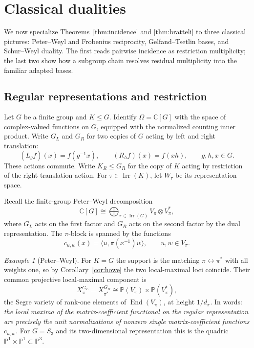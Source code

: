 \documentclass[10pt]{amsart}
\theoremstyle{remark}
\newtheorem{example}[theorem]{Example}
\DeclareMathOperator{\End}{End}
\newcommand{\PP}{\mathbb P}
\begin{document}
\section{Classical dualities}\label{sec:examples}

We now specialize Theorems~\ref{thm:incidence} and \ref{thm:bratteli} to three classical pictures:
Peter--Weyl and Frobenius reciprocity, Gelfand--Tsetlin bases, and Schur--Weyl duality. The first reads
pairwise incidence as restriction multiplicity; the last two show how a subgroup chain resolves residual
multiplicity into the familiar adapted bases.

\subsection{Regular representations and restriction}

Let $G$ be a finite group and $K\leq G$.
Identify $\Omega=\mathbb{C}[G]$ with the space of
complex-valued functions on $G$, equipped with the
normalized counting inner product.
Write $G_L$ and $G_R$ for two copies of $G$ acting by
left and right translation:
\[
 (L_gf)(x)=f(g^{-1}x),
 \qquad
 (R_hf)(x)=f(xh),
 \qquad g,h,x\in G.
\]
These actions commute.
Write $K_R\leq G_R$ for the copy of $K$ acting by
restriction of the right translation action.
For $\tau\in\operatorname{Irr}(K)$, let $W_\tau$
be its representation space.

Recall the finite-group Peter--Weyl decomposition \cite{GoodmanWallach}
\[
 \mathbb{C}[G]
 \cong
 \bigoplus_{\pi\in\operatorname{Irr}(G)}
 V_\pi\otimes V_\pi^*,
\]
where $G_L$ acts on the first factor and $G_R$
acts on the second factor by the dual representation.
The $\pi$-block is spanned by the functions
\[
 c_{u,w}(x)=\langle u,\pi(x^{-1})w\rangle,
 \qquad u,w\in V_\pi.
\]

\begin{example}[Peter--Weyl]\label{ex:PW}
For $K=G$ the support is the matching $\pi\leftrightarrow\pi^*$ with all weights one, so by
Corollary~\ref{cor:howe} the two local-maximal loci coincide. Their common projective
local-maximal component is
\[
 X_\pi^{G_L}=X_{\pi^*}^{G_R}
 \cong\PP(V_\pi)\times\PP(V_\pi^*),
\]
the Segre variety of rank-one elements of $\End(V_\pi)$, at height $1/d_\pi$. In words: \emph{the local
maxima of the matrix-coefficient functional on the regular representation are precisely
the unit normalizations of nonzero single
matrix-coefficient functions $c_{u,w}$.} For $G=S_3$ and its two-dimensional representation this is the quadric
$\PP^1\times\PP^1\subset\PP^3$.
\end{example}
\end{document}

